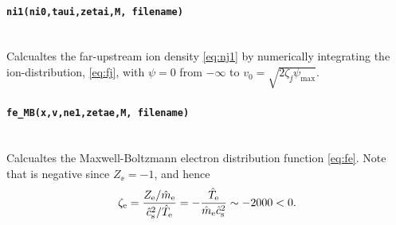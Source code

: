 \documentclass[11pt,a4paper, 
swedish, english %
]{article}
\begin{document}
\paragraph{\texttt{ni1(ni0,taui,zetai,M, filename)}}\mbox{}\\
Calcualtes the far-upstream ion density \eqref{eq:nj1} by
numerically integrating the ion-distribution, \eqref{eq:fj}, with
$\psi=0$ from $-\infty$ to $v_0=\sqrt{2\zeta_{\jj}\psi_{\max}}$.

\paragraph{\texttt{fe\_MB(x,v,ne1,zetae,M, filename)}}\mbox{}\\
Calcualtes the Maxwell-Boltzmann electron distribution function
\eqref{eq:fe}. Note that  is negative since $Z_{\ee}=-1$,
and hence
\begin{equation}
\zeta_{\mathrm{e}}=\frac{Z_{\mathrm{e}}/\hat{m}_{\mathrm{e}}}{\hat{c}_{\text{s}}^2/\hat{T}_{\mathrm{e}}}
=-\frac{\hat{T}_{\mathrm{e}}}{\hat{m}_{\mathrm{e}}\hat{c}_{\text{s}}^2}\sim-2000<0.
\end{equation}







\end{document}
